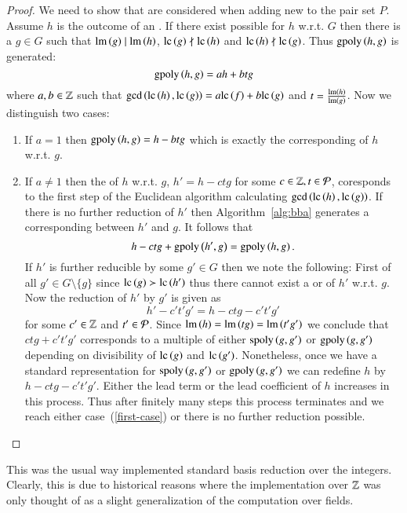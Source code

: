 \begin{proof}
We need to show that \lcrs are considered when adding new \gpts to the pair set
$P$. Assume $h$ is the outcome of an \ltr. If there exist possible \lcrs for $h$
w.r.t. $G$ then there is a $g \in G$ such that $\operatorname{lm}\left({g}\right) \mid \operatorname{lm}\left({h}\right)$, $\mathrm{lc}\left({g}\right)
\nmid \mathrm{lc}\left({h}\right)$ and $\mathrm{lc}\left({h}\right) \nmid \mathrm{lc}\left({g}\right)$. Thus $\mathrm{gpoly}\left({h},{g}\right)$ is generated:
\[\mathrm{gpoly}\left({h},{g}\right) = a h + b t g\]
where $a, b \in \mathbb{Z}$ such that $\gcd\left(\mathrm{lc}\left({h}\right), \mathrm{lc}\left({g}\right)\right) = a \mathrm{lc}\left({f}\right) + b \mathrm{lc}\left({g}\right)$ and $t = \frac{\operatorname{lm}\left({h}\right)}{\operatorname{lm}\left({g}\right)}$. Now we distinguish two cases:
\begin{enumerate}
\item\label{first-case} If $a=1$ then $\mathrm{gpoly}\left({h},{g}\right) = h - b t g$ which is exactly the corresponding
\lcr of $h$ w.r.t. $g$.
\item If $a \neq 1$ then the \lcr of $h$ w.r.t. $g$, $h' = h - ctg$ for some
$c\in \mathbb{Z}, t\in\mathcal{P}$, coresponds to the first step
of the Euclidean algorithm calculating $\gcd\left(\mathrm{lc}\left({h}\right), \mathrm{lc}\left({g}\right)\right)$. If there
is no further reduction of $h'$ then Algorithm~\ref{alg:bba} generates a corresponding
\gpt between $h'$ and $g$. It follows that
\[h - ctg + \mathrm{gpoly}\left({h'},{g}\right) = \mathrm{gpoly}\left({h},{g}\right).\]
If $h'$ is further reducible by some $g' \in G$ then we note the following:
First of all $g' \in G\setminus \{g\}$ since $\mathrm{lc}\left({g}\right) \succ \mathrm{lc}\left({h'}\right)$ thus there
cannot exist a \ltr or \lcr of $h'$ w.r.t. $g$. Now the reduction of $h'$ by
$g'$ is given as
\[h' - c't'g' = h - ctg - c't'g'\]
for some $c' \in \mathbb{Z}$ and $t' \in \mathcal{P}$. Since $\operatorname{lm}\left({h}\right) = \operatorname{lm}\left({tg}\right) = \operatorname{lm}\left({t'g'}\right)$ we
conclude that $ctg + c't'g'$ corresponds to a multiple of either $\mathrm{spoly}\left({g},{g'}\right)$ or $\mathrm{gpoly}\left({g},{g'}\right)$ depending on divisibility of $\mathrm{lc}\left({g}\right)$ and $\mathrm{lc}\left({g'}\right)$.
Nonetheless, once we have a standard representation for $\mathrm{spoly}\left({g},{g'}\right)$ or
$\mathrm{gpoly}\left({g},{g'}\right)$ we can redefine $h$ by $h - ctg - c't'g'$. Either the lead term or
the lead coefficient of $h$ increases in this process. Thus after finitely many
steps this process terminates and we reach either case~(\ref{first-case}) or
there is no further \lcr reduction possible.
\end{enumerate}
\end{proof}

This was the usual way \singular implemented standard basis reduction over the
integers. Clearly, this is due to historical reasons where the implementation
over $\mathbb{Z}$ was only thought of as a slight generalization of the computation
over fields.

